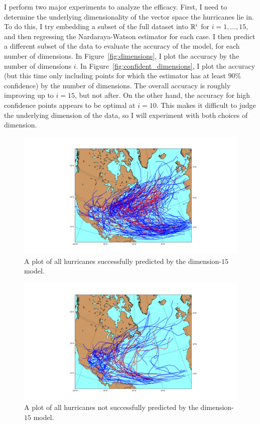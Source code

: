
\par
I perform two major experiments to analyze the efficacy.
First, I need to determine the underlying dimensionality of the vector space the hurricanes lie in.
To do this, I try embedding a subset of the full dataset into $\mathbb{R}^{i}$ for $i=1,\ldots,15$, and then regressing the Nardaraya-Watson estimator for each case.
I then predict a different subset of the data to evaluate the accuracy of the model, for each number of dimensions.
In Figure~\ref{fig:dimensions}, I plot the accuracy by the number of dimensions $i$.
In Figure~\ref{fig:confident_dimensions}, I plot the accuracy (but this time only including points for which the estimator has at least $90\%$ confidence) by the number of dimensions.
The overall accuracy is roughly improving up to $i=15$, but not after.
On the other hand, the accuracy for high confidence points appears to be optimal at $i=10$.
This makes it difficult to judge the underlying dimension of the data, so I will experiment with both choices of dimension.

\begin{figure}
	\centering
	\includegraphics[width=\textwidth]{images/got_it_right.png}
	\caption{A plot of all hurricanes successfully predicted by the dimension-$15$ model.}
	\label{fig:got_it_right}
\end{figure}

\begin{figure}
	\centering
	\includegraphics[width=\textwidth]{images/got_it_wrong.png}
	\caption{A plot of all hurricanes not successfully predicted by the dimension-$15$ model.}
	\label{fig:got_it_wrong}
\end{figure}

